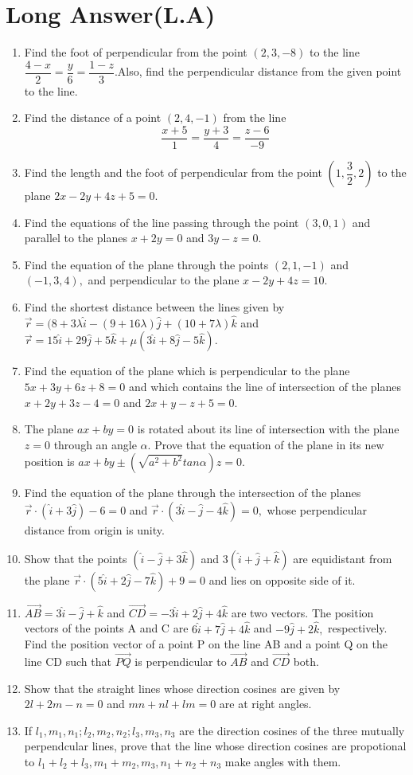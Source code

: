 \documentclass[12pt]{article}
\providecommand{\brak}[1]{\ensuremath{\left(#1\right)}}
\begin{document}
\section*{Long Answer(L.A)}
\begin{enumerate}[resume]
\item Find the foot of perpendicular from the point $(2,3,-8)$ to the line  $\dfrac{4-x}{2}=\dfrac{y}{6}=\dfrac{1-z}{3}$.Also, find the perpendicular distance from the given point to the line.
\item Find the distance of a point $(2,4,-1)$ from the line $$\frac{x+5}{1}=\frac{y+3}{4}=\frac{z-6}{-9}$$
\item Find the length and the foot of perpendicular from the point $ \brak{1,\dfrac{3}{2} ,2 }$ to the plane $2x-2y+4z+5=0.$
\item Find the equations of the line passing through the point $(3,0,1)$ and parallel to the planes $x+2y=0$ and $3y-z=0.$
\item Find the equation of the plane through the points $(2,1,-1)$ and $(-1,3,4),$ and 
perpendicular to the plane $x-2y+4z=10.$
\item Find the shortest distance between the lines given by $\overrightarrow{r}=(8+3\lambda\hat{i}-(9+16\lambda)\hat{j}+(10+7\lambda)\hat{k}$ and $\overrightarrow{r}=15\hat{i}+29\hat{j}+5\hat{k}+\mu(3\hat{i}+8\hat{j}-5\hat{k}).$
\item Find the equation of the plane which is perpendicular to the plane $5x+3y+6z+8=0$ and which contains the line of intersection of the planes $x+2y+3z-4=0$ and $2x+y-z+5=0.$
\item The plane $ax+by=0$ is rotated about its line of intersection with the plane $z=0$ through an angle $\alpha.$ Prove that the equation of the plane in its new position is $ax+by \pm (\sqrt{a^2+b^2} tan\alpha)z=0.$
\item Find the equation of the plane through the intersection of the planes $\overrightarrow{r} \cdot (\hat{i}+3\hat{j}) - 6=0$ and $\overrightarrow{r} \cdot (3\hat{i}-\hat{j}-4\hat{k})=0,$ whose perpendicular distance from origin is unity.
\item Show that the points $(\hat{i}-\hat{j}+3\hat{k})$ and $3(\hat{i}+\hat{j}+\hat{k})$ are equidistant from the plane $\overrightarrow{r} \cdot (5\hat{i}+2\hat{j}-7\hat{k})+9=0$ and lies on opposite side of it.
\item $\overrightarrow{AB}=3\hat{i}-\hat{j}+\hat{k}$ and $\overrightarrow{CD}=-3\hat{i}+2\hat{j}+4\hat{k}$ are two vectors. The position vectors of the points A and C are $6\hat{i}+7\hat{j}+4\hat{k}$ and $-9\hat{j}+2\hat{k},$ respectively. Find the position vector of a point P on the line AB and a point Q on the line CD such that $\overrightarrow{PQ}$ is perpendicular to $\overrightarrow{AB}$ and $\overrightarrow{CD}$ both.
\item Show that the straight lines whose direction cosines are given by $2l+2m-n=0$ and $mn+nl+lm=0$ are at right angles.
\item If $l_1, m_1, n_1;l_2, m_2, n_2;l_3, m_3, n_3$ are the direction cosines of the three mutually perpendcular lines, prove that the line whose direction cosines are propotional to $l_1+l_2+l_3 , m_1+m_2,m_3, n_1+n_2+n_3$ make angles with them.
\end{enumerate}
\end{document}
